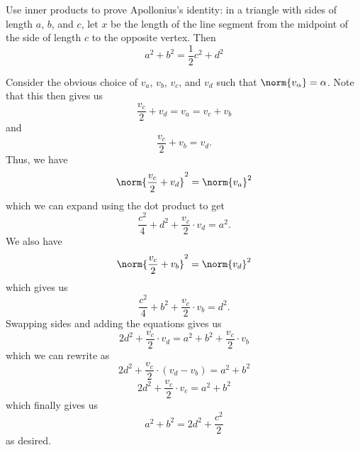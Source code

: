 \documentclass[12pt,letterpaper]{hmcpset}
\begin{document}
\begin{problem}[31]
	Use inner products to prove Apollonius's identity: in a triangle with sides of length $a$, $b$, and $c$, let $x$ be the length of the line segment from the midpoint of the side of length $c$ to the opposite vertex. Then 
	\[
		a^2 + b^2 = \frac{1}{2} c^2 + d^2
	\]
\end{problem}

\begin{solution}
	Consider the obvious choice of $v_a$, $v_b$, $v_c$, and $v_d$ such that \( \norm{v_\alpha} = \alpha \). Note that this then gives us
	\[
		\frac{v_c}{2} + v_d = v_a = v_c + v_b
	\]
	and
	\[
		\frac{v_c}{2} + v_b = v_d.
	\]
	Thus, we have 
	\[
		\norm{\frac{v_c}{2} + v_d}^2 = \norm{v_a}^2
	\]
	which we can expand using the dot product to get
	\[
		\frac{c^2}{4} + d^2 + \frac{v_c}{2} \cdot v_d = a^2.
	\]
	We also have 
	\[
		\norm{\frac{v_c}{2} + v_b}^2 = \norm{v_d}^2
	\]
	which gives us
	\[
		\frac{c^2}{4} + b^2 + \frac{v_c}{2} \cdot v_b = d^2.
	\]
	Swapping sides and adding the equations gives us
	\[
		2d^2 + \frac{v_c}{2} \cdot v_d = a^2 + b^2 + \frac{v_c}{2} \cdot v_b
	\]
	which we can rewrite as 
	\[
		2d^2 + \frac{v_c}{2} \cdot (v_d - v_b) = a^2 + b^2
	\]
	\[
		2d^2 + \frac{v_c}{2} \cdot v_c = a^2 + b^2
	\]
	which finally gives us
	\[
		a^2 + b^2 = 2d^2 + \frac{c^2}{2}
	\]
	as desired.
\end{solution}

\end{document}
